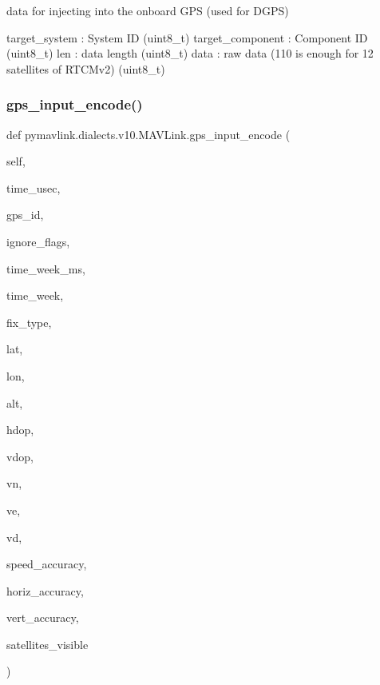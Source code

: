 \begin{DoxyVerb}
\begin{DoxyVerb}
\begin{DoxyVerb}data for injecting into the onboard GPS (used for DGPS)

target_system             : System ID (uint8_t)
target_component          : Component ID (uint8_t)
len                       : data length (uint8_t)
data                      : raw data (110 is enough for 12 satellites of RTCMv2) (uint8_t)\end{DoxyVerb}
 \mbox{\label{classpymavlink_1_1dialects_1_1v10_1_1MAVLink_a0161b03e6345d13f2ed8b50bcd9ece39}} 
\subsubsection{\texorpdfstring{gps\+\_\+input\+\_\+encode()}{gps\_input\_encode()}}
{\footnotesize\ttfamily def pymavlink.\+dialects.\+v10.\+M\+A\+V\+Link.\+gps\+\_\+input\+\_\+encode (\begin{DoxyParamCaption}\item[{}]{self,  }\item[{}]{time\+\_\+usec,  }\item[{}]{gps\+\_\+id,  }\item[{}]{ignore\+\_\+flags,  }\item[{}]{time\+\_\+week\+\_\+ms,  }\item[{}]{time\+\_\+week,  }\item[{}]{fix\+\_\+type,  }\item[{}]{lat,  }\item[{}]{lon,  }\item[{}]{alt,  }\item[{}]{hdop,  }\item[{}]{vdop,  }\item[{}]{vn,  }\item[{}]{ve,  }\item[{}]{vd,  }\item[{}]{speed\+\_\+accuracy,  }\item[{}]{horiz\+\_\+accuracy,  }\item[{}]{vert\+\_\+accuracy,  }\item[{}]{satellites\+\_\+visible }\end{DoxyParamCaption})}


\end{DoxyVerb}
\end{DoxyVerb}
